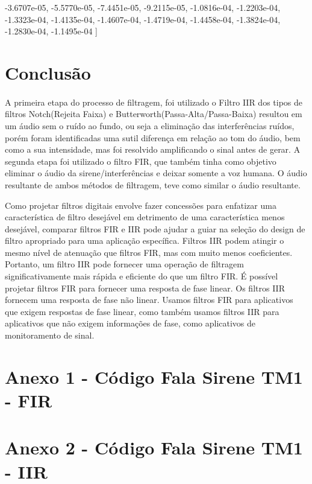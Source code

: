 \documentclass[12pt,fleqn]{article}
\begin{document}
\begin{enumerate}
-3.6707e-05,  -5.5770e-05, -7.4451e-05, -9.2115e-05, -1.0816e-04, -1.2203e-04, -1.3323e-04, -1.4135e-04, -1.4607e-04,  -1.4719e-04, -1.4458e-04, -1.3824e-04, -1.2830e-04, -1.1495e-04 ]
\end{enumerate}{}


\section{Conclusão}

\paragraph{} A primeira etapa do processo de filtragem, foi utilizado o Filtro IIR dos tipos de filtros Notch(Rejeita Faixa) e Butterworth(Passa-Alta/Passa-Baixa) resultou em um áudio sem o ruído ao fundo, ou seja a eliminação das interferências ruídos, porém foram identificadas uma sutil diferença em relação ao tom do áudio, bem como a sua intensidade, mas foi resolvido amplificando o sinal antes de gerar. A segunda etapa foi utilizado o filtro FIR, que também tinha como objetivo eliminar o áudio da sirene/interferências e deixar somente a voz humana. O áudio resultante de ambos métodos de filtragem, teve como similar o áudio resultante.

Como projetar filtros digitais envolve fazer concessões para enfatizar uma característica de filtro desejável em detrimento de uma característica menos desejável, comparar filtros FIR e IIR pode ajudar a guiar na seleção do design de filtro apropriado para uma aplicação específica. Filtros IIR podem atingir o mesmo nível de atenuação que filtros FIR, mas com muito menos coeficientes. Portanto, um filtro IIR pode fornecer uma operação de filtragem significativamente mais rápida e eficiente do que um filtro FIR. É possível projetar filtros FIR para fornecer uma resposta de fase linear. Os filtros IIR fornecem uma resposta de fase não linear. Usamos filtros FIR para aplicativos que exigem respostas de fase linear, como também usamos filtros IIR para aplicativos que não exigem informações de fase, como aplicativos de monitoramento de sinal.

\newpage
{}
\nocite{*} %



\newpage
\section{Anexo 1 - Código Fala Sirene TM1 - FIR}


\newpage
\section{Anexo 2 - Código Fala Sirene TM1 - IIR}

\end{document}
